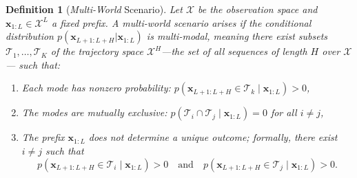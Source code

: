 \documentclass[a4paper,oneside,bibliography=totoc]{scrbook}
\newtheorem{definition}{Definition} \newtheorem{proposition}{Proposition}
\begin{document}
\begin{definition}[\textit{Multi-World} Scenario]
Let $\mathcal{X}$ be the observation space and $\mathbf{x}_{1:L}\in\mathcal{X}^L$ a fixed prefix. 
A \emph{\textit{multi-world} scenario} arises if the conditional distribution $p(\mathbf{x}_{L+1:L+H}|\mathbf{x}_{1:L})$ is \emph{multi-modal}, meaning there exist subsets $\mathcal{T}_1, \dots, \mathcal{T}_K$ of the trajectory space $\mathcal{X}^H$—the set of all sequences of length $H$ over $\mathcal{X}$—
such that:
\begin{enumerate}
    \item Each mode has nonzero probability: $p(\mathbf{x}_{L+1:L+H} \in \mathcal{T}_k \mid \mathbf{x}_{1:L}) > 0$,
    \item The modes are mutually exclusive: $p(\mathcal{T}_i \cap \mathcal{T}_j \mid \mathbf{x}_{1:L}) = 0$ for all $i \neq j$,
    \item The prefix $\mathbf{x}_{1:L}$ does not determine a unique outcome; formally, there exist $i \ne j$ such that 
\[
p(\mathbf{x}_{L+1:L+H} \in \mathcal{T}_i \mid \mathbf{x}_{1:L}) > 0
\quad \text{and} \quad
p(\mathbf{x}_{L+1:L+H} \in \mathcal{T}_j \mid \mathbf{x}_{1:L}) > 0.
\]
\end{enumerate}
\end{definition}
\end{document}
